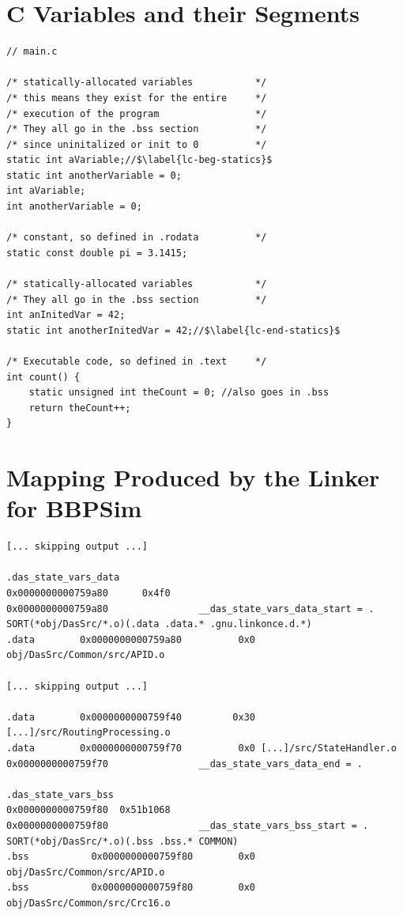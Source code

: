 {
\chapter{C Variables and their Segments}\label{code:c-to-segments}
\begin{verbatim}
// main.c

/* statically-allocated variables       	*/
/* this means they exist for the entire 	*/
/* execution of the program             	*/
/* They all go in the .bss section 			*/
/* since uninitalized or init to 0 			*/
static int aVariable;//$\label{lc-beg-statics}$
static int anotherVariable = 0;
int aVariable;
int anotherVariable = 0;

/* constant, so defined in .rodata		 	*/
static const double pi = 3.1415;

/* statically-allocated variables       	*/
/* They all go in the .bss section 			*/
int anInitedVar = 42;
static int anotherInitedVar = 42;//$\label{lc-end-statics}$

/* Executable code, so defined in .text 	*/
int count() {
	static unsigned int theCount = 0; //also goes in .bss 
	return theCount++;
}
\end{verbatim}

\chapter{Mapping Produced by the Linker for BBPSim}\label{map:ld}

{\small
\begin{verbatim}
[... skipping output ...]

.das_state_vars_data
0x0000000000759a80      0x4f0
0x0000000000759a80                __das_state_vars_data_start = .
SORT(*obj/DasSrc/*.o)(.data .data.* .gnu.linkonce.d.*)
.data        0x0000000000759a80          0x0 obj/DasSrc/Common/src/APID.o

[... skipping output ...]

.data        0x0000000000759f40         0x30 [...]/src/RoutingProcessing.o
.data        0x0000000000759f70          0x0 [...]/src/StateHandler.o
0x0000000000759f70                __das_state_vars_data_end = .

.das_state_vars_bss
0x0000000000759f80  0x51b1068
0x0000000000759f80                __das_state_vars_bss_start = .
SORT(*obj/DasSrc/*.o)(.bss .bss.* COMMON)
.bss           0x0000000000759f80        0x0 obj/DasSrc/Common/src/APID.o
.bss           0x0000000000759f80        0x0 obj/DasSrc/Common/src/Crc16.o


\end{verbatim}}}
